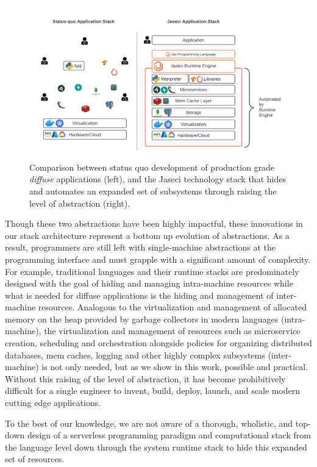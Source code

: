 \begin{figure}[tb]
    \centering
    \includegraphics[width=\linewidth]{figures/jaseci_stack.pdf}
    \caption{Comparison between status quo development of production grade \emph{diffuse} applications (left), and the Jaseci technology stack that hides and automates an expanded set of subsystems through raising the level of abstraction (right).}
    \label{fig:intro}
\end{figure}



Though these two abstractions have been highly impactful, these innovations in our stack architecture represent a bottom up evolution of abstractions.
As a result, programmers are still left with single-machine abstractions at the programming interface and must grapple with a significant amount of complexity.
For example, traditional languages and their runtime stacks are predominately designed with the goal of hiding and managing intra-machine resources while what is needed for diffuse applications is the hiding and management of inter-machine resources.
Analogous to the virtualization and management of allocated memory on the heap provided by garbage collectors in modern languages (intra-machine), the virtualization and management of resources such as microservice creation, scheduling and orchestration alongside policies for organizing distributed databases, mem caches, logging and other highly complex subsystems (inter-machine) is not only needed, but as we show in this work, possible and practical.
Without this raising of the level of abstraction, it has become prohibitively difficult for a single engineer to invent, build, deploy, launch, and scale modern cutting edge applications.

To the best of our knowledge, we are not aware of a thorough, wholistic, and top-down design of a serverless programming paradigm and computational stack from the language level down through the system runtime stack to hide this expanded set of resources.


